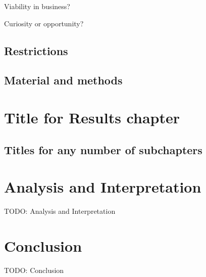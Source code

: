 Viability in business?

Curiosity or opportunity?

\subsection{Restrictions}


\subsection{Material and methods}

\newpage

\section{Title for Results chapter}
\subsection{Titles for any number of subchapters}

\newpage

\section{Analysis and Interpretation}
TODO: Analysis and Interpretation

\newpage

\section{Conclusion}
TODO: Conclusion
